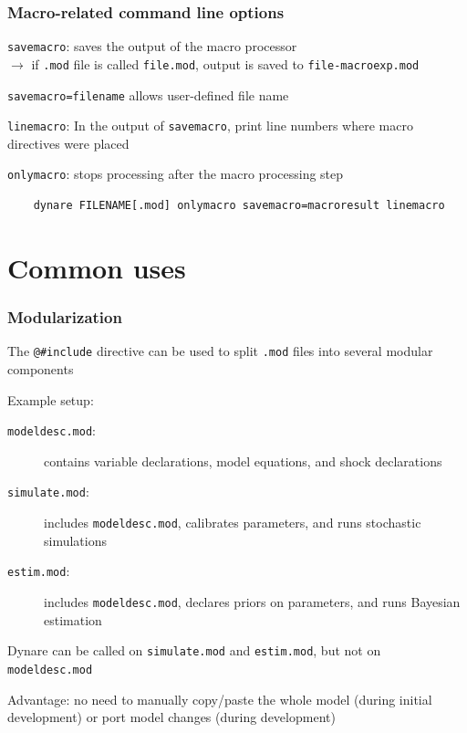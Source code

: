 \documentclass[handout,usepdftitle=false,xcolor=dvipsnames,aspectratio=169]{beamer}
\begin{document}
\begin{frame}[fragile]
  \frametitle{Macro-related command line options}
  \begin{witemize}
    \item \texttt{savemacro}: saves the output of the macro processor\\
    $\rightarrow$ if \texttt{.mod} file is called \texttt{file.mod}, output is saved to \texttt{file-macroexp.mod}
    \item \texttt{savemacro=filename} allows user-defined file name
    \item \texttt{linemacro}: In the output of \texttt{savemacro}, print line numbers where macro directives were placed
    \item \texttt{onlymacro}: stops processing after the macro processing step
  \end{witemize}
  \begin{verbatim}
    dynare FILENAME[.mod] onlymacro savemacro=macroresult linemacro
   \end{verbatim}
\end{frame}

\section{Common uses}

\begin{frame}[fragile]
  \frametitle{Modularization}
  \begin{witemize}
    \item The \verb+@#include+ directive can be used to split \texttt{.mod} files into several modular components
    \item Example setup:
    \begin{description}
      \item[\texttt{modeldesc.mod}:] contains variable declarations, model equations, and shock declarations
      \item[\texttt{simulate.mod}:] includes \texttt{modeldesc.mod}, calibrates parameters, and runs stochastic simulations
      \item[\texttt{estim.mod}:] includes \texttt{modeldesc.mod}, declares priors on parameters, and runs Bayesian estimation
    \end{description}
    \item Dynare can be called on \texttt{simulate.mod} and \texttt{estim.mod}, but not on \texttt{modeldesc.mod}
    \item Advantage: no need to manually copy/paste the whole model (during initial development) or port model changes (during development)
  \end{witemize}
\end{frame}
\end{document}
